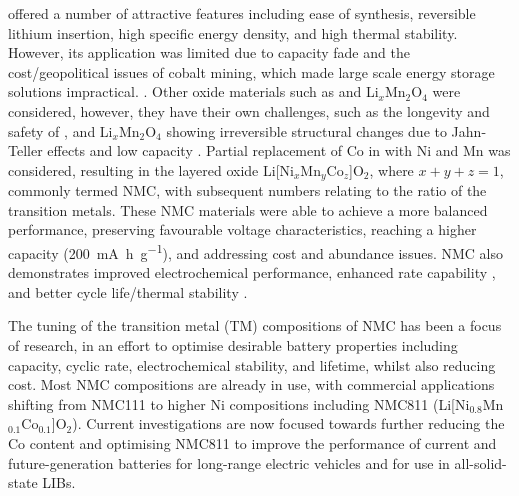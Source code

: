 \documentclass[journal=jacsat,manuscript=article]{achemso}
\begin{document}
 offered a number of attractive features including ease of synthesis, reversible lithium insertion, high specific energy density, and high thermal stability.\cite{gibbard1989high,plichta1989improved,noh2013comparison} 
However, its application was limited due to capacity fade and the cost/geopolitical issues of cobalt mining, which made large scale energy storage solutions impractical. \cite{mo_impact_2018,Banza2009}. 
Other oxide materials such as  and Li$_x$Mn$_2$O$_4$ were considered, however, they have their own challenges, such as the longevity and safety of , \cite{min_comparative_2016} and Li$_x$Mn$_2$O$_4$ showing irreversible structural changes due to Jahn-Teller effects and low capacity \cite{tian_performance_2018}. Partial replacement of Co in  with Ni and Mn was considered, resulting in the layered oxide Li[Ni$_x$Mn$_y$Co$_z$]O$_2$, where $x+y+z=1$, commonly termed NMC, with subsequent numbers relating to the ratio of the transition metals.\cite{paulsen2000o2,paulsen20002, lu2001layered,rozier2015li} 
These NMC materials were able to achieve a more balanced performance, preserving favourable voltage characteristics, reaching a higher capacity (\SI{200}{mA.h.g^{-1}}), and addressing cost and abundance issues. \cite{sun_electronic_2017,larcher2015towards,ohzuku2001layered} 
NMC also demonstrates improved electrochemical performance, enhanced rate capability \cite{noh2013comparison,dahn1991rechargeable}, and better cycle life/thermal stability \cite{kim2006synthesis,armstrong1996synthesis}.

The tuning of the transition metal (TM) compositions of NMC has been a focus of research, in an effort to optimise desirable battery properties including capacity, cyclic rate, electrochemical stability, and lifetime, whilst also reducing cost. \cite{duan2019insights} Most NMC compositions are already in use, with commercial applications shifting from NMC111 to higher Ni compositions including NMC811 (Li[Ni$_{0.8}$Mn$_{0.1}$Co$_{0.1}$]O$_2$). \cite{zhang2018structural} 
Current investigations are now focused towards further reducing the Co content and optimising NMC811 to improve the performance of current and future-generation batteries for long-range electric vehicles \cite{azevedo2018mining} and for use in all-solid-state LIBs. \cite{myung2017nickel,ohzuku_layered_2001, lu2001layered,belharouak2003li,kim2014unexpected,sun_electronic_2017}
\end{document}
